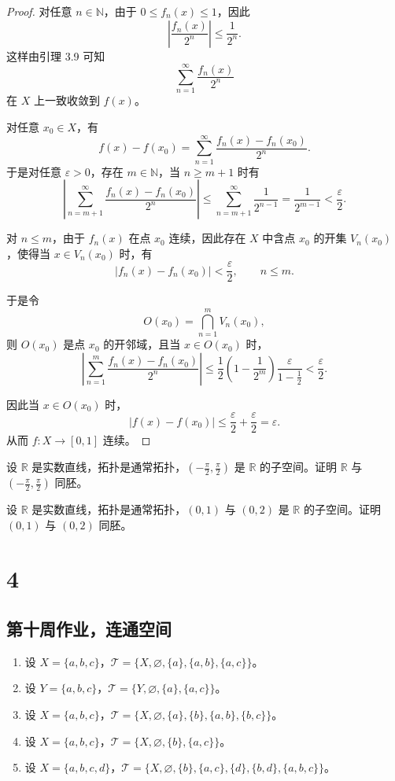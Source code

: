 \begin{proof}
对任意 $n\in\mathbb{N}$，由于 $0\le f_n(x)\le 1$，因此
\[
\left|\frac{f_n(x)}{2^n}\right|\le \frac{1}{2^n}.
\]
这样由引理 3.9 可知
\[
\sum_{n=1}^{\infty}\frac{f_n(x)}{2^n}
\]
在 $X$ 上一致收敛到 $f(x)$。

对任意 $x_0\in X$，有
\[
f(x)-f(x_0)=\sum_{n=1}^{\infty}\frac{f_n(x)-f_n(x_0)}{2^n}.
\]
于是对任意 $\varepsilon>0$，存在 $m\in\mathbb{N}$，当 $n\ge m+1$ 时有
\[
\left|\sum_{n=m+1}^{\infty}\frac{f_n(x)-f_n(x_0)}{2^n}\right|
\le \sum_{n=m+1}^{\infty}\frac{1}{2^{n-1}}
= \frac{1}{2^{m-1}}<\frac{\varepsilon}{2}.
\]

对 $n\le m$，由于 $f_n(x)$ 在点 $x_0$ 连续，因此存在 $X$ 中含点 $x_0$ 的开集
$V_n(x_0)$，使得当 $x\in V_n(x_0)$ 时，有
\[
|f_n(x)-f_n(x_0)|<\frac{\varepsilon}{2},\qquad n\le m.
\]

于是令
\[
O(x_0)=\bigcap_{n=1}^{m}V_n(x_0),
\]
则 $O(x_0)$ 是点 $x_0$ 的开邻域，且当 $x\in O(x_0)$ 时，
\[
\left|\sum_{n=1}^{m}\frac{f_n(x)-f_n(x_0)}{2^n}\right|
\le \frac12\left(1-\frac{1}{2^m}\right)\frac{\varepsilon}{1-\frac12}
<\frac{\varepsilon}{2}.
\]

因此当 $x\in O(x_0)$ 时，
\[
|f(x)-f(x_0)|
\le \frac{\varepsilon}{2}+\frac{\varepsilon}{2}
=\varepsilon.
\]
从而 $f:X\to[0,1]$ 连续。
\end{proof}
\begin{homework}[10] 
设 $\mathbb{R}$ 是实数直线，拓扑是通常拓扑，$(-\frac{\pi}{2}, \frac{\pi}{2})$ 是 $\mathbb{R}$ 的子空间。证明 $\mathbb{R}$ 与 $ \left( -\frac{\pi}{2}, \frac{\pi}{2} \right)$ 同胚。
\end{homework}

\begin{homework}[11]
设 $\mathbb{R}$ 是实数直线，拓扑是通常拓扑，$(0,1)$ 与 $(0,2)$ 是 $\mathbb{R}$ 的子空间。证明 $(0,1)$ 与 $(0,2)$ 同胚。
\end{homework}
\chapter{4}
\section{第十周作业，连通空间}

\begin{homework}[1]
\begin{enumerate}
  \item 设 $X=\{a,b,c\}$，$\mathcal{T}=\{X,\varnothing,\{a\},\{a,b\},\{a,c\}\}$。
  \item 设 $Y=\{a,b,c\}$，$\mathcal{T}=\{Y,\varnothing,\{a\},\{a,c\}\}$。
  \item 设 $X=\{a,b,c\}$，$\mathcal{T}=\{X,\varnothing,\{a\},\{b\},\{a,b\},\{b,c\}\}$。
  \item 设 $X=\{a,b,c\}$，$\mathcal{T}=\{X,\varnothing,\{b\},\{a,c\}\}$。
  \item 设 $X=\{a,b,c,d\}$，$\mathcal{T}=\{X,\varnothing,\{b\},\{a,c\},\{d\},\{b,d\},\{a,b,c\}\}$。
\end{enumerate}
\end{homework}


